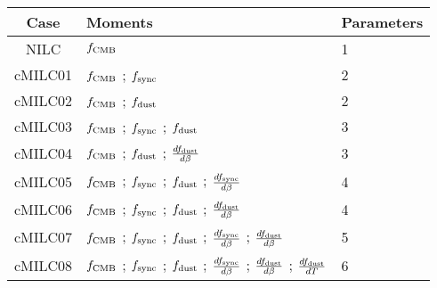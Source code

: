 \begin{tabular}{cll}
\toprule
    Case &                                                                                                                                               Moments &  Parameters \\
\midrule
 NILC &  $f_{\rm CMB}$ &  1 \\
 cMILC01 &  $f_{\rm CMB}$ ; $f_{\rm sync}$ &  2 \\
 cMILC02 &  $f_{\rm CMB}$ ; $f_{\rm dust}$ &  2 \\
 cMILC03 &  $f_{\rm CMB}$ ; $f_{\rm sync}$ ; $f_{\rm dust}$ &  3 \\
 cMILC04 &  $f_{\rm CMB}$ ; $f_{\rm dust}$ ; $\frac{d f_{\rm dust}}{d \beta}$ &  3 \\
 cMILC05 &  $f_{\rm CMB}$ ; $f_{\rm sync}$ ; $f_{\rm dust}$ ; $\frac{d f_{\rm sync}}{d \beta}$ &  4 \\
 cMILC06 &  $f_{\rm CMB}$ ; $f_{\rm sync}$ ; $f_{\rm dust}$ ; $\frac{d f_{\rm dust}}{d \beta}$ &  4 \\
 cMILC07 &  $f_{\rm CMB}$ ; $f_{\rm sync}$ ; $f_{\rm dust}$ ; $\frac{d f_{\rm sync}}{d \beta}$ ; $\frac{d f_{\rm dust}}{d \beta}$ &  5 \\
 cMILC08 &  $f_{\rm CMB}$ ; $f_{\rm sync}$ ; $f_{\rm dust}$ ; $\frac{d f_{\rm sync}}{d \beta}$ ; $\frac{d f_{\rm dust}}{d \beta}$ ; $\frac{d f_{\rm dust}}{d T}$ &  6 \\
\bottomrule
\end{tabular}

